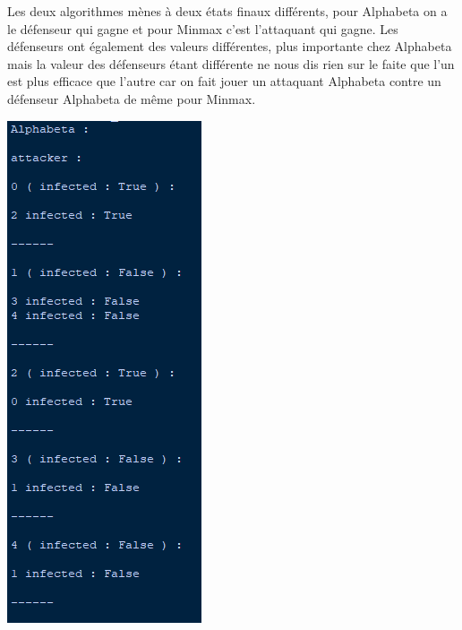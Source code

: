 \documentclass[a4paper,12pt]{article} %
\begin{document}
Les deux algorithmes mènes à deux états finaux différents, pour Alphabeta on a le défenseur qui gagne et pour Minmax c'est l'attaquant qui gagne. Les défenseurs ont également des valeurs différentes, plus importante chez Alphabeta mais la valeur des défenseurs étant différente ne nous dis rien sur le faite que l'un est plus efficace que l'autre car on fait jouer un attaquant Alphabeta contre un défenseur Alphabeta de même pour Minmax.

\begin{center}
\includegraphics[scale=0.7]{images/Capture3.PNG}

\end{center}
\end{document}
